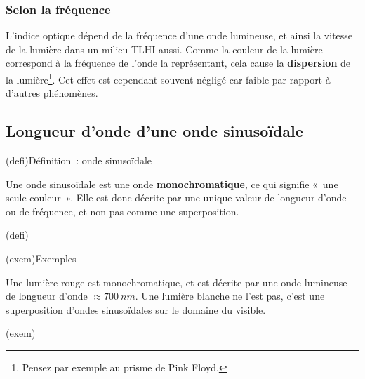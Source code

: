 \documentclass[../../main/main.tex]{subfiles}
\begin{document}
\subsubsection{Selon la fréquence}

L'indice optique dépend de la fréquence d'une onde lumineuse, et ainsi la
vitesse de la lumière dans un milieu TLHI aussi. Comme la couleur de la lumière
correspond à la fréquence de l'onde la représentant, cela cause la
\textbf{dispersion} de la lumière\footnote{Pensez par exemple au prisme de Pink
	Floyd.}. Cet effet est cependant souvent négligé car faible par rapport à
d'autres phénomènes.

\subsection{Longueur d'onde d'une onde sinusoïdale}

\begin{tcbraster}[raster columns=2, raster equal height=rows]

	\begin{tcb}(defi){Définition~: onde sinusoïdale}

		Une onde sinusoïdale est une onde \textbf{monochromatique}, ce qui
		signifie «~une seule couleur~». Elle est donc décrite par une unique
		valeur de longueur d'onde ou de fréquence, et non pas comme une
		superposition.

	\end{tcb}(defi)
	\begin{tcb}(exem){Exemples}

		Une lumière rouge est monochromatique, et est décrite par une onde
		lumineuse de longueur d'onde $\approx \SI{700}{nm}$. Une lumière blanche
		ne l'est pas, c'est une superposition d'ondes sinusoïdales sur le
		domaine du visible.

	\end{tcb}(exem)
\end{tcbraster}
\end{document}
